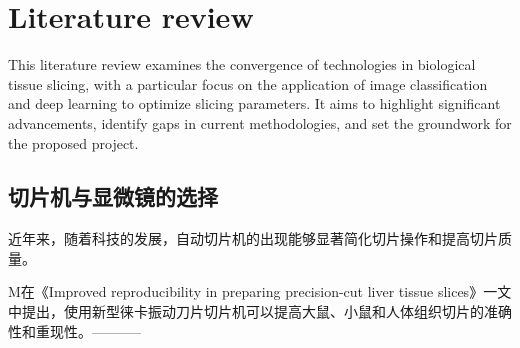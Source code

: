 





\section{Literature review}

This literature review examines the convergence of technologies in biological tissue slicing, with a particular focus on the application of image classification and deep learning to optimize slicing parameters. It aims to highlight significant advancements, identify gaps in current methodologies, and set the groundwork for the proposed project.

\subsection{切片机与显微镜的选择}


近年来，随着科技的发展，自动切片机的出现能够显著简化切片操作和提高切片质量。

M在《Improved reproducibility in preparing precision-cut liver tissue slices》一文中提出，使用新型徕卡振动刀片切片机可以提高大鼠、小鼠和人体组织切片的准确性和重现性。-----------



